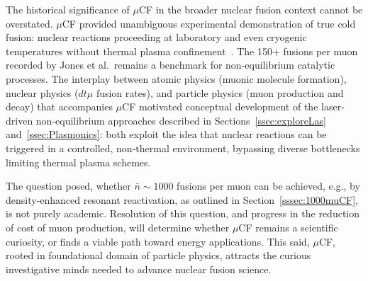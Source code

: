 \documentclass[particles,article,accept,pdftex,moreauthors]{Definitions/mdpi}
\newcommand{\rsec}[1]{Section~\ref{#1}}
\begin{document}
The historical significance of $\mu$CF in the broader nuclear fusion context cannot be overstated. $\mu$CF provided unambiguous experimental demonstration of true cold fusion: nuclear reactions proceeding at laboratory and even cryogenic temperatures without thermal plasma confinement~\cite{Rafelski:1987Jones}. The 150+ fusions per muon recorded by Jones et al.\ remains a benchmark for non-equilibrium catalytic processes. The interplay between atomic physics (muonic molecule formation), nuclear physics ($dt\mu$ fusion rates), and particle physics (muon production and decay) that accompanies $\mu$CF motivated conceptual development of the laser-driven non-equilibrium approaches described in Sections~\ref{ssec:exploreLas} and~\ref{ssec:Plasmonics}: both exploit the idea that nuclear reactions can be triggered in a controlled, non-thermal environment, bypassing diverse bottlenecks limiting thermal plasma schemes.

The question posed, whether $\bar{n}\sim 1000$ fusions per muon can be achieved, e.g., by density-enhanced resonant reactivation, as outlined in \rsec{sssec:1000muCF}, is not purely academic. Resolution of this question, and progress in the reduction of cost of muon production, will determine whether $\mu$CF remains a scientific curiosity, or finds a viable path toward energy applications. This said, $\mu$CF, rooted in foundational domain of particle physics, attracts the curious investigative minds needed to advance nuclear fusion science.
\end{document}
